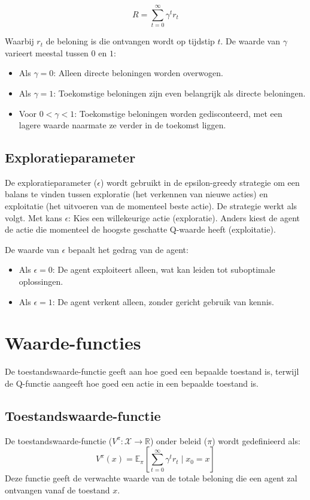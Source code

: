 \documentclass[a4paper,12pt]{report}
\begin{document}
\[
    R = \sum_{t=0}^\infty \gamma^t r_t
\]

Waarbij \(r_t\) de beloning is die ontvangen wordt op tijdstip \(t\). De waarde
van \(\gamma\) varieert meestal tussen \(0\) en \(1\):
\begin{itemize}
    \item Als \(\gamma = 0\): Alleen directe beloningen worden overwogen.
    \item Als \(\gamma = 1\): Toekomstige beloningen zijn even belangrijk als directe
          beloningen.
    \item Voor \(0 < \gamma < 1\): Toekomstige beloningen worden gedisconteerd, met een
          lagere waarde naarmate ze verder in de toekomst liggen.
\end{itemize}

\subsection{Exploratieparameter}

De exploratieparameter (\(\epsilon\)) wordt gebruikt in de epsilon-greedy
strategie om een balans te vinden tussen exploratie (het verkennen van nieuwe
acties) en exploitatie (het uitvoeren van de momenteel beste actie). De
strategie werkt als volgt. Met kans \(\epsilon\): Kies een willekeurige actie
(exploratie). Anders kiest de agent de actie die momenteel de hoogste geschatte
Q-waarde heeft (exploitatie).

De waarde van \(\epsilon\) bepaalt het gedrag van de agent:
\begin{itemize}
    \item Als \(\epsilon = 0\): De agent exploiteert alleen, wat kan leiden tot
          suboptimale oplossingen.
    \item Als \(\epsilon = 1\): De agent verkent alleen, zonder gericht gebruik van
          kennis.
\end{itemize}

\section{Waarde-functies}
De toestandswaarde-functie geeft aan hoe goed een bepaalde toestand is, terwijl
de Q-functie aangeeft hoe goed een actie in een bepaalde toestand is.
\subsection{Toestandswaarde-functie}
De toestandswaarde-functie (\(V^\pi: \mathcal{X} \to \mathbb{R}\)) onder beleid
(\(\pi\)) wordt gedefinieerd als:
\[
    V^\pi(x) = \mathbb{E}_\pi\left[\sum_{t=0}^\infty \gamma^t r_t \mid x_0 = x\right]
\]
Deze functie geeft de verwachte waarde van de totale beloning die een agent zal
ontvangen vanaf de toestand \(x\).
\end{document}
